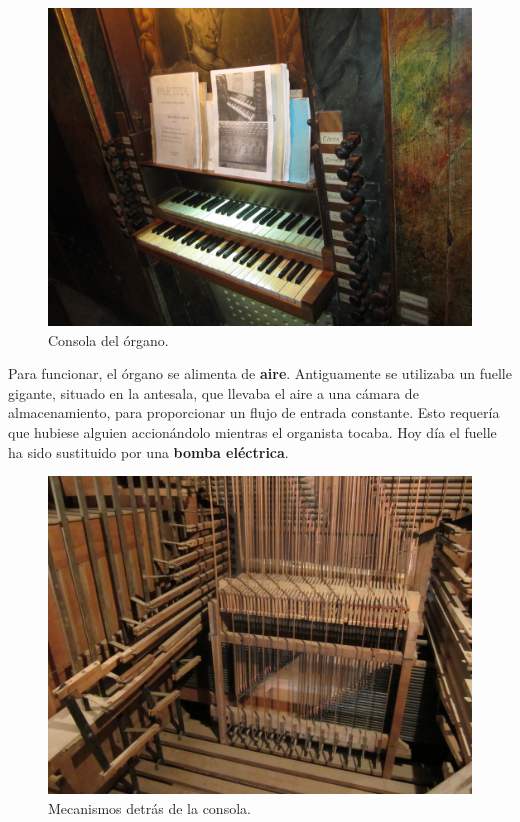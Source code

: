 \begin{figure}[H]
	\noindent \begin{centering}
		\includegraphics[width=\linewidth]{capitulo3/consola}
		\par\end{centering}
	\smallskip
	\caption{\label{fig:consola} Consola del órgano.}
\end{figure} 

\smallskip

Para funcionar, el órgano se alimenta de \textbf{aire}. Antiguamente se utilizaba un fuelle gigante, situado en la antesala, que llevaba el aire a una cámara de almacenamiento, para proporcionar un flujo de entrada constante. Esto requería que hubiese alguien accionándolo mientras el organista tocaba. Hoy día el fuelle ha sido sustituido por una \textbf{bomba eléctrica}.

\smallskip

\begin{figure}[H]
	\noindent \begin{centering}
		\includegraphics[width=\linewidth*3/4]{capitulo3/mecanismos}
		\par\end{centering}
	\smallskip
	\caption{\label{fig:mecanismos} Mecanismos detrás de la consola.}
\end{figure} 

